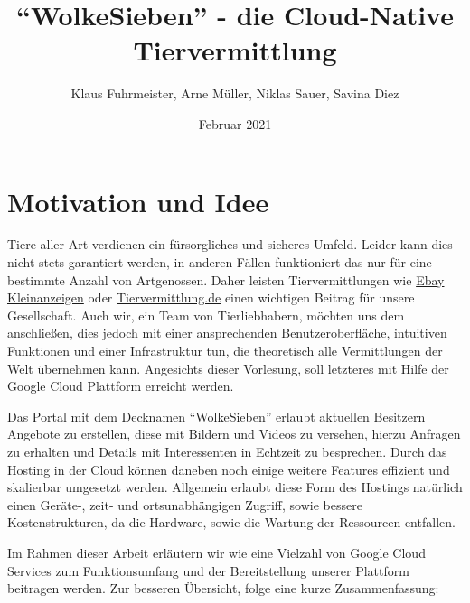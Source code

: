 \documentclass{article}
\title{\enquote{WolkeSieben} - die Cloud-Native Tiervermittlung}
\author{Klaus Fuhrmeister, Arne Müller, Niklas Sauer, Savina Diez}
\date{Februar 2021}
\begin{document}
\maketitle

\section{Motivation und Idee} %

Tiere aller Art verdienen ein fürsorgliches und sicheres Umfeld. Leider kann dies nicht stets garantiert werden, in anderen Fällen funktioniert das nur für eine bestimmte Anzahl von Artgenossen. Daher leisten Tiervermittlungen wie \href{https://www.ebay-kleinanzeigen.de/s-haustiere/c130}{Ebay Kleinanzeigen} oder \href{https://www.tiervermittlung.de}{Tiervermittlung.de}  einen wichtigen Beitrag für unsere Gesellschaft. Auch wir, ein Team von Tierliebhabern, möchten uns dem anschließen, dies jedoch mit einer ansprechenden Benutzeroberfläche, intuitiven Funktionen und einer Infrastruktur tun, die theoretisch alle Vermittlungen der Welt übernehmen kann. Angesichts dieser Vorlesung, soll letzteres mit Hilfe der Google Cloud Plattform erreicht werden.

Das Portal mit dem Decknamen \enquote{WolkeSieben} erlaubt aktuellen Besitzern Angebote zu erstellen, diese mit Bildern und Videos zu versehen, hierzu Anfragen zu erhalten und Details mit Interessenten in Echtzeit zu besprechen. Durch das Hosting in der Cloud können daneben noch einige weitere Features effizient und skalierbar umgesetzt werden. Allgemein erlaubt diese Form des Hostings natürlich einen Geräte-, zeit- und ortsunabhängigen Zugriff, sowie bessere Kostenstrukturen, da die Hardware, sowie die Wartung der Ressourcen entfallen.

Im Rahmen dieser Arbeit erläutern wir wie eine Vielzahl von Google Cloud Services zum Funktionsumfang und der Bereitstellung unserer Plattform beitragen werden. Zur besseren Übersicht, folge eine kurze Zusammenfassung:
\end{document}
